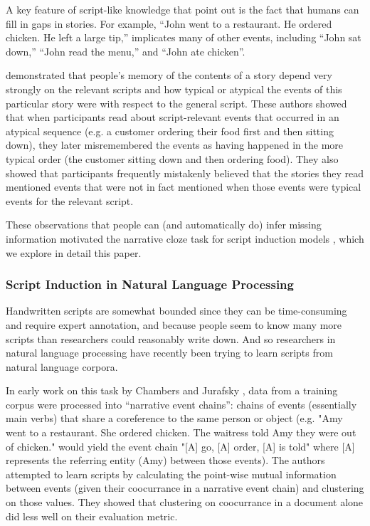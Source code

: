 \documentclass[10pt,a4paper]{article}
\begin{document}
A key feature of script-like knowledge that  point out is the fact that humans can fill in gaps in stories. For example, ``John went to a restaurant. He ordered chicken. He left a large tip,” implicates many of other events, including ``John sat down,” ``John read the menu,” and “John ate chicken”.

 demonstrated that people’s memory of the contents of a story depend very strongly on the relevant scripts and how typical or atypical the events of this particular story were with respect to the general script. These authors showed that when participants read about script-relevant events that occurred in an atypical sequence (e.g. a customer ordering their food first and then sitting down), they later misremembered the events as having happened in the more typical order (the customer sitting down and then ordering food). They also showed that participants frequently mistakenly believed that the stories they read mentioned events that were not in fact mentioned when those events were typical events for the relevant script.

These observations that people can (and automatically do) infer missing information motivated the narrative cloze task for script induction models \cite{chambers2008unsupervised}, which we explore in detail this paper.

\subsubsection{Script Induction in Natural Language Processing}

Handwritten scripts are somewhat bounded since they can be time-consuming and require expert annotation, and because  people seem to know many more scripts than researchers could reasonably write down. And so researchers in natural language processing have recently been trying to learn scripts from natural language corpora.

In early work on this task by Chambers and Jurafsky , data from a training corpus were processed into “narrative event chains”: chains of events (essentially main verbs) that share a coreference to the same person or object (e.g. "Amy went to a restaurant. She ordered chicken. The waitress told Amy they were out of chicken." would yield the event chain "[A] go, [A] order, [A] is told" where [A] represents the referring entity (Amy) between those events). The authors attempted to learn scripts by calculating the point-wise mutual information between events (given their coocurrance in a narrative event chain) and clustering on those values. They showed that clustering on coocurrance in a document alone did less well on their evaluation metric.
\end{document}
